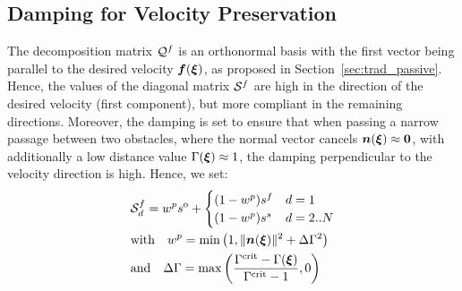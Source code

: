\subsection{Damping for Velocity Preservation}
The decomposition matrix $\mathcal{Q}^{f}$ is an orthonormal basis with the first vector being parallel to the desired velocity $\boldsymbol{f}(\boldsymbol{\xi})$, as proposed in Section~\ref{sec:trad_passive}. Hence, the values of the diagonal matrix $\mathcal{S}^{f}$ are high in the direction of the desired velocity (first component), but more compliant in the remaining directions. 
Moreover, the damping is set to ensure that when passing a narrow passage between two obstacles, where the normal vector cancels $\boldsymbol{n}(\boldsymbol{\xi}) \approx \boldsymbol{0}$, with additionally a low distance value $\Gamma(\boldsymbol{\xi}) \approx 1$, the damping perpendicular to the velocity direction is high. Hence, we set:
\begin{equation}
  \begin{split}
  & \matd{S}^{f}_{d} =
  w^p s^{\mathrm{o}} + 
  \begin{cases}
   (1- w^p) s^f & d = 1 \\
   (1- w^p) s^s & d = 2 .. N 
  \end{cases} \\
  & \text{with} \quad
   w^p = \min \left(1,  \| \vecs n(\vecs \xi) \|^2 +  \Delta \Gamma ^2 \right) \\
   & \text{and} \quad \Delta \Gamma = \max \left(\frac{\Gamma^{\mathrm{crit}} -\Gamma(\vecs \xi)}{\Gamma^{\mathrm{crit}} - 1}, 0\right)
  \end{split}
  \label{eq:velocity_damping}
\end{equation}


